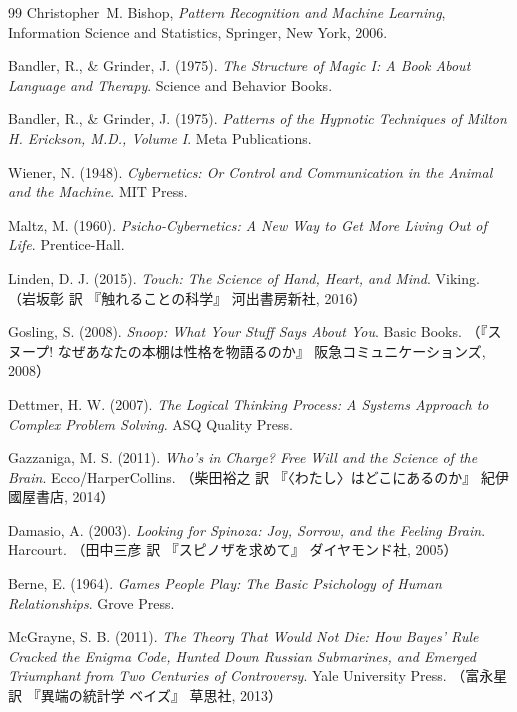 \begin{thebibliography}{99}
    Christopher~M. Bishop, 
    \newblock \emph{Pattern Recognition and Machine Learning}, 
    \newblock Information Science and Statistics, Springer, New York, 2006.

Bandler, R., \& Grinder, J. (1975). \textit{The Structure of Magic I: A Book About Language and Therapy}. Science and Behavior Books.

Bandler, R., \& Grinder, J. (1975). \textit{Patterns of the Hypnotic Techniques of Milton H. Erickson, M.D., Volume I}. Meta Publications.

Wiener, N. (1948). \textit{Cybernetics: Or Control and Communication in the Animal and the Machine}. MIT Press.

Maltz, M. (1960). \textit{Psicho-Cybernetics: A New Way to Get More Living Out of Life}. Prentice-Hall.

Linden, D. J. (2015). \textit{Touch: The Science of Hand, Heart, and Mind}. Viking. （岩坂彰 訳 『触れることの科学』 河出書房新社, 2016）

Gosling, S. (2008). \textit{Snoop: What Your Stuff Says About You}. Basic Books. （『スヌープ! なぜあなたの本棚は性格を物語るのか』 阪急コミュニケーションズ, 2008）

Dettmer, H. W. (2007). \textit{The Logical Thinking Process: A Systems Approach to Complex Problem Solving}. ASQ Quality Press.

Gazzaniga, M. S. (2011). \textit{Who's in Charge? Free Will and the Science of the Brain}. Ecco/HarperCollins. （柴田裕之 訳 『〈わたし〉はどこにあるのか』 紀伊國屋書店, 2014）

Damasio, A. (2003). \textit{Looking for Spinoza: Joy, Sorrow, and the Feeling Brain}. Harcourt. （田中三彦 訳 『スピノザを求めて』 ダイヤモンド社, 2005）

Berne, E. (1964). \textit{Games People Play: The Basic Psichology of Human Relationships}. Grove Press.

McGrayne, S. B. (2011). \textit{The Theory That Would Not Die: How Bayes' Rule Cracked the Enigma Code, Hunted Down Russian Submarines, and Emerged Triumphant from Two Centuries of Controversy}. Yale University Press. （富永星 訳 『異端の統計学 ベイズ』 草思社, 2013）


\end{thebibliography}
